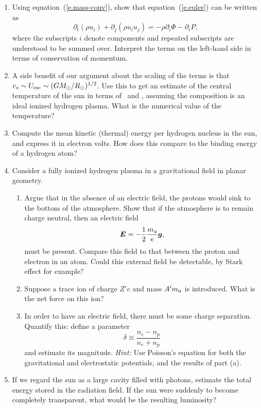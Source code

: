 \begin{enumerate}
\item Using equation~(\ref{e.mass-conv}), show that equation~(\ref{e.euler}) can be written as
\begin{equation}\label{e.momentum-conv}
\partial_{t}(\rho u_{i}) + \partial_{j}(\rho u_{i}u_{j}) = -\rho\partial_{i}\Phi - \partial_{i}P,
\end{equation}
where the subscripts $i$ denote components and repeated subscripts are understood to be summed over. Interpret the terms on the left-hand side in terms of conservation of momentum.

\item A side benefit of our argument about the scaling of the terms is that $c_{s}\sim U_{\mathrm{esc}} \sim (GM_\odot/R_{\odot})^{1/2}$.  Use this to get an estimate of the central temperature of the sun in terms of \Msun\ and \Rsun, assuming the composition is an ideal ionized hydrogen plasma.  What is the numerical value of the temperature?

\item Compute the mean kinetic (thermal) energy per hydrogen nucleus in the sun, and express it in electron volts. How does this compare to the binding energy of a hydrogen atom?


\item Consider a fully ionized hydrogen plasma in a gravitational field in planar geometry. 
\begin{enumerate}
\item Argue that in the absence of an electric field, the protons would sink to the bottom of the atmosphere. Show that if the atmosphere is to remain charge neutral, then an electric field
\[
	\boldsymbol{E} = -\frac{1}{2}\frac{m_\mathrm{u}}{e}\boldsymbol{g},
\]
must be present. Compare this field to that between the proton and electron in an atom.  Could this external field be detectable, by Stark effect for example?

\item Suppose a trace ion of charge $Z'e$ and mass $A'm_\mathrm{u}$ is	 introduced.  What is the net force on this ion?

\item In order to have an electric field, there must be some charge separation.  Quantify this: define a parameter
\[ \delta \equiv \frac{n_{e}-n_{p}}{n_{e} + n_{p}} \]
and estimate its magnitude.  \emph{Hint:} Use Poisson's equation for both the gravitational and electrostatic potentials, and the results of part (a).
\end{enumerate}

\item If we regard the sun as a large cavity filled with photons, estimate the total energy stored in the radiation field.  If the sun were suddenly to become completely transparent, what would be the resulting luminosity?

\end{enumerate}

